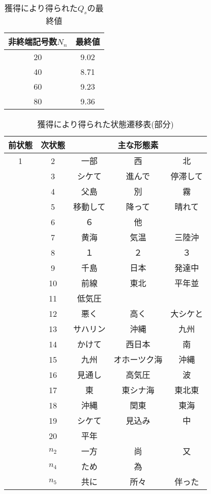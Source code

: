 \begin{table}[htb]
\caption{獲得により得られた$Q_s$の最終値} \label{hyo2}
\begin{center}
\begin{tabular}{c|c}
\hline \hline
非終端記号数$N_n$ & 最終値 \\ \hline \hline
20 & 9.02 \\
40 & 8.71 \\
60 & 9.23 \\
80 & 9.36 \\
\hline \hline
\end{tabular}
\end{center}
\end{table}


\begin{table}[htb]
\begin{center}
\caption{獲得により得られた状態遷移表(部分)} \label{hyo3}
\scriptsize
\begin{tabular}{c|c|ccc} \hline \hline
前状態 & 次状態 & & 主な形態素 \\ \hline \hline
1 & 2 & 一部 & 西 & 北 \\ 
 & 3 & シケて & 進んで& 停滞して \\ 
 & 4 & 父島 & 別 & 霧  \\ 
 & 5 & 移動して& 降って & 晴れて \\
 & 6 & ６& 他&  \\
 & 7 & 黄海 & 気温 & 三陸沖 \\
 & 8 & １& ２ & ３ \\ 
 & 9 & 千島 & 日本 & 発達中  \\
 & 10 & 前線& 東北 & 平年並 \\ 
 & 11 & 低気圧 \\
 & 12 & 悪く & 高く & 大シケと \\ 
 & 13 & サハリン & 沖縄 & 九州 \\ 
 & 14 & かけて & 西日本 & 南  \\ 
 & 15 & 九州 & オホーツク海 & 沖縄\\ 
 & 16 & 見通し & 高気圧 & 波 \\ 
 & 17 & 東  & 東シナ海 & 東北東 \\ 
 & 18 & 沖縄 & 関東 & 東海 \\
 & 19 & シケて & 見込み & 中 \\
 & 20 & 平年 \\ 
 & $n_2$ & 一方 & 尚 & 又 \\ 
 & $n_4$ & ため & 為 \\  
 & $n_5$ & 共に & 所々 & 伴った \\ 

\end{tabular}
\end{center}
\end{table}
